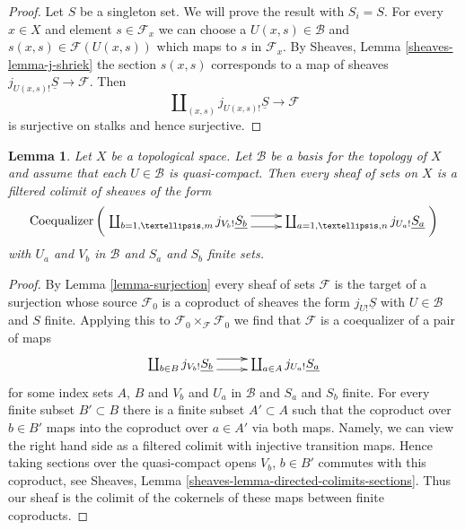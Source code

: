 \documentclass{stacks-project}
\theoremstyle{plain}
\newtheorem{lemma}[subsection]{Lemma}
\theoremstyle{definition}
\theoremstyle{remark}
\numberwithin{equation}{subsection}
\begin{document}
\begin{proof}
Let $S$ be a singleton set. We will prove the result with $S_i = S$.
For every $x \in X$ and element $s \in \mathcal{F}_x$ we can choose
a $U(x, s) \in \mathcal{B}$ and $s(x, s) \in \mathcal{F}(U(x, s))$
which maps to $s$ in $\mathcal{F}_x$. By
Sheaves, Lemma \ref{sheaves-lemma-j-shriek}
the section $s(x, s)$
corresponds to a map of sheaves $j_{U(x, s)!}\underline{S} \to \mathcal{F}$.
Then
$$
\coprod\nolimits_{(x, s)} j_{U(x, s)!}\underline{S} \to \mathcal{F}
$$
is surjective on stalks and hence surjective.
\end{proof}

\begin{lemma}
\label{lemma-filtered-colimit-constructibles}
Let $X$ be a topological space. Let $\mathcal{B}$ be a basis for the
topology of $X$ and assume that each $U \in \mathcal{B}$ is quasi-compact.
Then every sheaf of sets on $X$ is a filtered colimit of sheaves of the form
\begin{equation}
\label{equation-towards-constructible-sets}
\text{Coequalizer}\left(
\xymatrix{
\coprod\nolimits_{b = 1, \ldots, m} j_{V_b!}\underline{S_b}
\ar@<1ex>[r] \ar@<-1ex>[r] &
\coprod\nolimits_{a = 1, \ldots, n} j_{U_a!}\underline{S_a}
}
\right)
\end{equation}
with $U_a$ and $V_b$ in $\mathcal{B}$ and $S_a$ and $S_b$ finite sets.
\end{lemma}

\begin{proof}
By Lemma \ref{lemma-surjection} every sheaf of sets $\mathcal{F}$
is the target of a surjection whose source $\mathcal{F}_0$ is a coproduct
of sheaves the form $j_{U!}\underline{S}$ with $U \in \mathcal{B}$
and $S$ finite. Applying this to
$\mathcal{F}_0 \times_\mathcal{F} \mathcal{F}_0$
we find that $\mathcal{F}$ is a coequalizer of a pair of maps
$$
\xymatrix{
\coprod\nolimits_{b \in B} j_{V_b!}\underline{S_b}
\ar@<1ex>[r] \ar@<-1ex>[r] &
\coprod\nolimits_{a \in A} j_{U_a!}\underline{S_a}
}
$$
for some index sets $A$, $B$ and $V_b$ and $U_a$ in $\mathcal{B}$ and
$S_a$ and $S_b$ finite. For every finite subset $B' \subset B$
there is a finite subset $A' \subset A$ such that the coproduct
over $b \in B'$ maps into the coproduct over $a \in A'$ via both maps.
Namely, we can view the right hand side as a filtered colimit with
injective transition maps. Hence taking sections over the quasi-compact
opens $V_b$, $b \in B'$ commutes with this coproduct,
see Sheaves, Lemma \ref{sheaves-lemma-directed-colimits-sections}.
Thus our sheaf is the colimit of the cokernels of these maps
between finite coproducts.
\end{proof}
\end{document}
